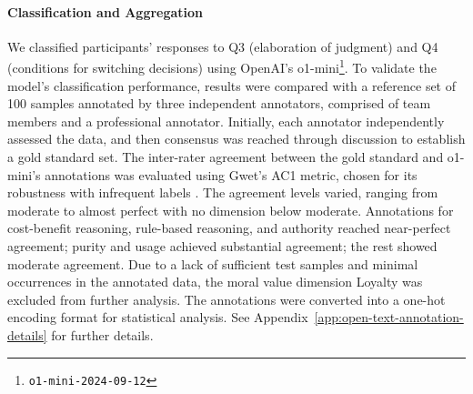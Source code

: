 \paragraph{Classification and Aggregation} 
We classified participants' responses to Q3 (elaboration of judgment) and Q4 (conditions for switching decisions) using OpenAI's o1-mini\footnote{\texttt{o1-mini-2024-09-12}}. To validate the model's classification performance, results were compared with a reference set of 100 samples annotated by three independent annotators, comprised of team members and a professional annotator. Initially, each annotator independently assessed the data, and then consensus was reached through discussion to establish a gold standard set. The inter-rater agreement between the gold standard and o1-mini's annotations was evaluated using Gwet's AC1 metric, chosen for its robustness with infrequent labels \citep{wongpakaran2013comparison}. The agreement levels varied, ranging from moderate to almost perfect with no dimension below moderate. Annotations for cost-benefit reasoning, rule-based reasoning, and authority reached near-perfect agreement; purity and usage achieved substantial agreement; the rest showed moderate agreement.
Due to a lack of sufficient test samples and minimal occurrences in the annotated data, the moral value dimension Loyalty was excluded from further analysis. The annotations were converted into a one-hot encoding format for statistical analysis. See Appendix~\ref{app:open-text-annotation-details} for further details.
